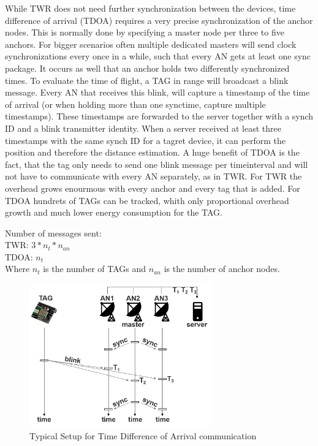 While TWR does not need further synchronization between the devices, time difference of arrival (TDOA) requires a very precise synchronization of the anchor nodes. This is normally done by specifying a master node per three to five anchors. For bigger scenarios often multiple dedicated masters will send clock synchronizations every once in a while, such that every AN gets at least one sync package. It occurs as well that an anchor holds two differently synchronized times.
To evaluate the time of flight, a TAG in range will broadcast a blink message. Every AN that receives this blink, will capture a timestamp of the time of arrival (or when holding more than one synctime, capture multiple timestamps). These timestamps are forwarded to the server together with a synch ID and a blink transmitter identity. When a server received at least three timestamps with the same synch ID for a tagret device, it can perform the position and therefore the distance estimation.
A huge benefit of TDOA is the fact, that the tag only needs to send one blink message per timeinterval and will not have to communicate with every AN separately, as in TWR. For TWR the overhead grows enourmous with every anchor and every tag that is added. For TDOA hundrets of TAGs can be tracked, whith only proportional overhead growth and much lower energy consumption for the TAG. 

Number of messages sent:\\
TWR: $3 * n_{t} * n_{an}$\\
TDOA: $n_{t}$\\
Where $n_{t}$ is the number of TAGs and $n_{an}$ is the number of anchor nodes.
\cite{SewioTDOA}

\begin{figure}[th]
\centering
\includegraphics[width=0.7\textwidth]{Figures/time_difference_of_arrival}
\decoRule
\caption[Time Difference of Arrival]{Typical Setup for Time Difference of Arrival communication}
\label{fig:time_difference_of_arrival}
\end{figure}


